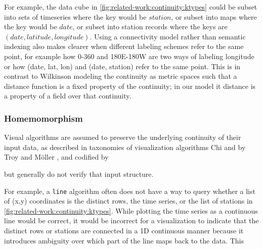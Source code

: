 For example, the data cube in \autoref{fig:related-work:continuity:ktypes} could be subset into sets of timeseries where the key would be $station$, or subset into maps where the key would be $date$, or subset into station records where the keys are $(date, latitude, longitude)$. Using a connectivity model rather than semantic indexing also makes clearer when different labeling schemes refer to the same point, for example how 0-360 and 180E-180W are two ways of labeling longitude or how (date, lat, lon) and (date, station) refer to the same point. 
This is in contrast to Wilkinson modeling the continuity as metric spaces\cite{wilkinsonGrammarGraphics2005} such that a distance function is a fixed property of the continuity; in our model it distance is a property of a field over that continuity. 

\subsubsection{Homemomorphism}
\label{sec:related-work:continuity}
Visual algorithms are assumed to preserve the underlying continuity of their input data, as described in taxonomies of visualization algorithms Chi\cite{chiTaxonomyVisualizationTechniques2000} and by Troy and M\"{o}ller \cite{toryRethinkingVisualizationHighlevel2004}, and codified by 


but generally do not verify that input structure. 

For example, a \texttt{line} algorithm often does not have a way to query whether a list of (x,y) coordinates is the distinct rows, the time series, or the list of stations in \autoref{fig:related-work:continuity:ktypes}. While plotting the time series as a continuous line would be correct, it would be incorrect for a visualization to indicate that the distinct rows or stations are connected in a 1D continuous manner because it introduces ambiguity over which part of the line maps back to the data. This 


